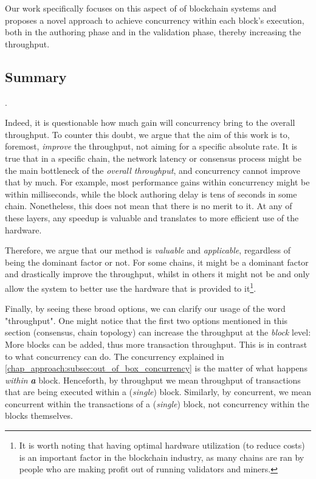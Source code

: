 Our work specifically focuses on this aspect of of blockchain systems and proposes a novel approach
to achieve concurrency within each block's execution, both in the authoring phase and in the
validation phase, thereby increasing the throughput.

\subsection{Summary} \label{chap_bg:subsec:summary_speedup}

.

Indeed, it is questionable how much gain will concurrency bring to the overall throughput. To
counter this doubt, we argue that the aim of this work is to, foremost, \textit{improve} the
throughput, not aiming for a specific absolute rate. It is true that in a specific chain, the
network latency or consensus process might be the main bottleneck of the \textit{overall
throughput}, and concurrency cannot improve that by much. For example, most performance gains within
concurrency might be within milliseconds, while the block authoring delay is tens of seconds in some
chain. Nonetheless, this does not mean that there is no merit to it. At any of these layers, any
speedup is valuable and translates to more efficient use of the hardware.

Therefore, we argue that our method is \textit{valuable} and \textit{applicable}, regardless of
being the dominant factor or not. For some chains, it might be a dominant factor and drastically
improve the throughput, whilst in others it might not be and only allow the system to better use the
hardware that is provided to it\footnote{It is worth noting that having optimal hardware utilization
(to reduce costs) is an important factor in the blockchain industry, as many chains are ran by
people who are making profit out of running validators and miners.}.

Finally, by seeing these broad options, we can clarify our usage of the word "throughput". One might
notice that the first two options mentioned in this section (consensus, chain topology) can increase
the throughput at the \textit{block} level: More blocks can be added, thus more transaction
throughput. This is in contrast to what concurrency can do. The concurrency explained in
\ref{chap_approach:subsec:out_of_box_concurrency} is the matter of what happens \textit{within}
\textit{\textbf{a}} block. Henceforth, by throughput we mean throughput of transactions that are
being executed within a (\textit{single}) block. Similarly, by concurrent, we mean concurrent within
the transactions of a (\textit{single}) block, not concurrency within the blocks themselves.


